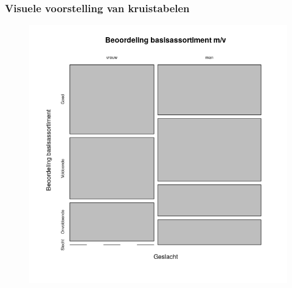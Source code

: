 \documentclass[aspectratio=169]{beamer}
\begin{document}
\begin{frame}
  \frametitle{Visuele voorstelling van kruistabelen}
  
  \begin{figure}
    \centering
    \includegraphics[height=.9\textheight]{img/2var-xtab-plot-waardering}
  \end{figure}
  
\end{frame}
\end{document}
